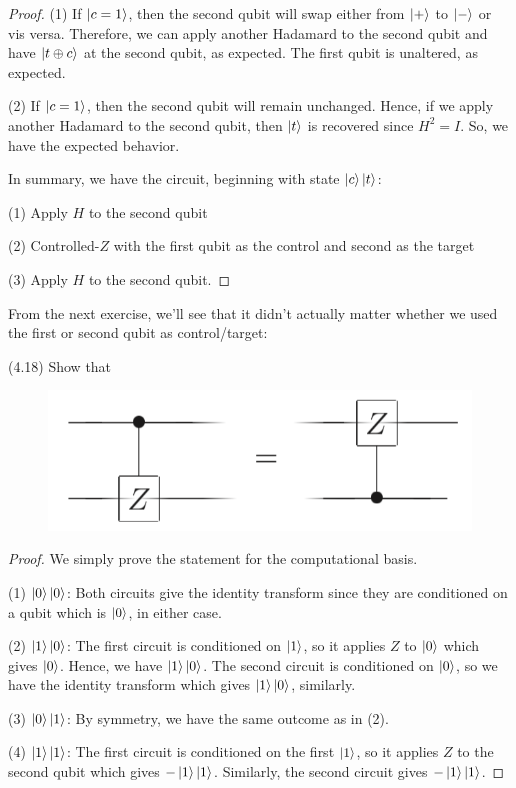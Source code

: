 \documentclass[main.tex]{subfiles}
\begin{document}
\begin{subappendices}
\begin{exercise}
\begin{proof}
(1) If $\ket{c = 1}$, then the second qubit will swap either from $\ket{+}$ to $\ket{-}$ or vis versa. Therefore, we can apply another Hadamard to the second qubit and have $\ket{t \oplus c}$ at the second qubit, as expected. The first qubit is unaltered, as expected.

(2) If $\ket{c = 1}$, then the second qubit will remain unchanged. Hence, if we apply another Hadamard to the second qubit, then $\ket{t}$ is recovered since $H^2 = I$. So, we have the expected behavior. 

In summary, we have the circuit, beginning with state $\ket{c}\ket{t}$:

(1) Apply $H$ to the second qubit

(2) Controlled-$Z$ with the first qubit as the control and second as the target 

(3) Apply $H$ to the second qubit. 
\end{proof}
\end{exercise}

From the next exercise, we'll see that it didn't actually matter whether we used the first or second qubit as control/target:

\begin{exercise}(4.18) Show that
	
\begin{figure}[H]
\centering
\includegraphics[width=.4\linewidth]{images/4_18.png}
\end{figure}

\begin{proof}
We simply prove the statement for the computational basis. 

(1) $\ket{0}\ket{0}$: Both circuits give the identity transform since they are conditioned on a qubit which is $\ket{0}$, in either case.

(2) $\ket{1}\ket{0}$: The first circuit is conditioned on $\ket{1}$, so it applies $Z$ to $\ket{0}$ which gives $\ket{0}$. Hence, we have $\ket{1}\ket{0}$. The second circuit is conditioned on $\ket{0}$, so we have the identity transform which gives $\ket{1}\ket{0}$, similarly.

(3) $\ket{0}\ket{1}$: By symmetry, we have the same outcome as in (2). 

(4) $\ket{1}\ket{1}$: The first circuit is conditioned on the first $\ket{1}$, so it applies $Z$ to the second qubit which gives $-\ket{1}\ket{1}$. Similarly, the second circuit gives $-\ket{1}\ket{1}$.
\end{proof}
\end{exercise}


\end{subappendices}
\end{document}
